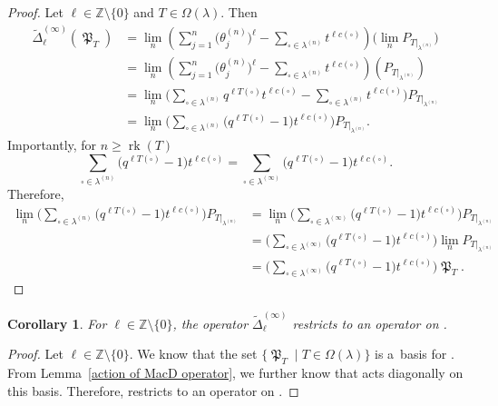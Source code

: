 \documentclass[pdftex]{sigma}
\numberwithin{equation}{section}
\newtheorem{Corollary}[Theorem]{Corollary}
\theoremstyle{definition}
\DeclareMathOperator{\MacD}{\mathfrak{P}}
\DeclareMathOperator{\rk}{\mathrm{rk}}
\begin{document}
\begin{proof}
 Let $\ell \in \mathbb{Z}\setminus \{0\}$ and $T \in \Omega(\lambda)$. Then
 \begin{align*}
 \widetilde{\Delta}_{\ell}^{(\infty)}( \MacD_T) &= \lim_{n} \left(\sum_{j=1}^{n}\bigl(\theta^{(n)}_j\bigr)^{\ell} - \sum_{\square \in \lambda^{(n)}} t^{\ell c(\square)} \right) \bigl( \lim_{n} P_{T|_{\lambda^{(n)}}} \bigr) \\
 &= \lim_{n} \left(\sum_{j=1}^{n}\bigl(\theta^{(n)}_j\bigr)^{\ell} - \sum_{\square \in \lambda^{(n)}} t^{\ell c(\square)} \right) (P_{T|_{\lambda^{(n)}}}) \\
 &= \lim_{n} \biggl(\sum_{\square \in \lambda^{(n)}}q^{\ell T(\square)}t^{\ell c(\square)} -\sum_{\square \in \lambda^{(n)}}t^{\ell c(\square)} \biggr) P_{T|_{\lambda^{(n)}}} \\
 &= \lim_{n} \biggl(\sum_{\square \in \lambda^{(n)}} \bigl(q^{\ell T(\square)} -1\bigr)t^{\ell c(\square)} \biggr) P_{T|_{\lambda^{(n)}}}.
 \end{align*}
 Importantly, for $n \geq \rk(T)$
 \[
 \sum_{\square \in \lambda^{(n)}} \bigl(q^{\ell T(\square)} -1\bigr)t^{\ell c(\square)} = \sum_{\square \in \lambda^{(\infty)}} \bigl(q^{\ell T(\square)} -1\bigr)t^{\ell c(\square)}.
 \]
 Therefore,
 \begin{align*}
 \lim_{n} \biggl(\sum_{\square \in \lambda^{(n)}} \bigl(q^{\ell T(\square)} -1\bigr)t^{\ell c(\square)} \biggr) P_{T|_{\lambda^{(n)}}}&
 = \lim_{n} \biggl(\sum_{\square \in \lambda^{(\infty)}} \bigl(q^{\ell T(\square)} -1\bigr)t^{\ell c(\square)} \biggr) P_{T|_{\lambda^{(n)}}} \\
 & = \biggl(\sum_{\square \in \lambda^{(\infty)}} \bigl(q^{\ell T(\square)} -1\bigr)t^{\ell c(\square)} \biggr) \lim_{n} P_{T|_{\lambda^{(n)}}} \\
 & = \biggl(\sum_{\square \in \lambda^{(\infty)}} \bigl(q^{\ell T(\square)} -1\bigr)t^{\ell c(\square)} \biggr)\MacD_T. \tag*{\qed}
 \end{align*} \renewcommand{\qed}{}
\end{proof}

\begin{Corollary}
 For $\ell \in \mathbb{Z}\setminus \{0\}$, the operator $\widetilde{\Delta}_{\ell}^{(\infty)}$ restricts to an operator on .
\end{Corollary}

\begin{proof}
 Let $\ell \in \mathbb{Z} \setminus \{0\}$. We know that the set $\{ \MacD_{T} \mid T \in \Omega(\lambda)\}$ is a~basis for . From Lemma~\ref{action of MacD operator}, we further know that \smash{$\widetilde{\Delta}_{\ell}^{(\infty)}$} acts diagonally on this basis. Therefore, \smash{$\widetilde{\Delta}_{\ell}^{(\infty)}$} restricts to an operator on .
\end{proof}
\end{document}
